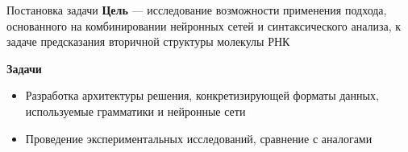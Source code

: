 \documentclass{beamer}
\begin{document}
\begin{frame}{Постановка задачи}
\textbf{Цель} --- исследование возможности применения подхода, основанного на комбинировании нейронных сетей и синтаксического анализа, к задаче предсказания вторичной структуры молекулы РНК

\vspace{6mm}

\textbf{Задачи}
\begin{itemize}
    \item Разработка архитектуры решения, конкретизирующей форматы данных, используемые грамматики и нейронные сети
    \item Проведение экспериментальных исследований, сравнение с аналогами
\end{itemize}
\end{frame}
\end{document}
